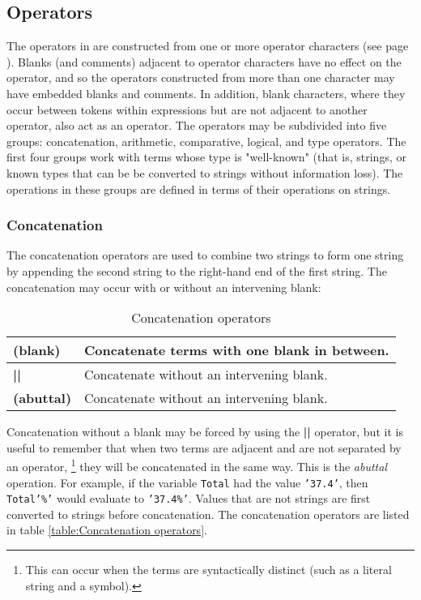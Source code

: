 \subsection{Operators}\label{refops}
The operators in \nr{} are constructed from one or more
operator characters (see page \pageref{refopers}).
Blanks (and comments) adjacent to operator characters have no effect on
the operator, and so the operators constructed from more than one
character may have embedded blanks and comments.
In addition, blank characters, where they occur between tokens within
expressions but are not adjacent to another operator, also act as an
operator.
 The operators may be subdivided into five groups: concatenation,
arithmetic, comparative, logical, and type operators.  The first four
groups work with terms whose type is "well-known" (that is,
strings, or known types that can be be converted to strings without
information loss).  The operations in these groups are defined in terms
of their operations on strings.
\subsubsection{Concatenation}
The concatenation operators are used to combine two strings to form
one string by appending the second string to the right-hand end of the
first string.  The concatenation may occur with or without an
intervening blank:
\begin{table}\caption{Concatenation operators}\label{table:Concatenation operators}
\begin{tabularx}{\textwidth}{>{\bfseries}lX}
\toprule
(blank)&Concatenate terms with one blank in between.
\\\midrule
||&Concatenate without an intervening blank.
\\\midrule
(abuttal)\label{refabut}&Concatenate without an intervening blank.
\\\bottomrule
\end{tabularx}
\end{table}
 Concatenation without a blank may be forced by using
the \textbf{||} operator, but it is useful to remember that
when two terms are adjacent and are not separated by an operator,
\footnote{
This can occur when the terms are syntactically distinct (such as a
literal string and a symbol).
}
they will be concatenated in the same way.
This is the \emph{abuttal} operation.
For example, if the variable \texttt{Total} had the value
\texttt{'37.4'}, then \texttt{Total'\%'} would evaluate to \texttt{'37.4\%'}.  
 Values that are not strings are first converted to strings before
concatenation. The concatenation operators are listed in table \ref{table:Concatenation operators}.
